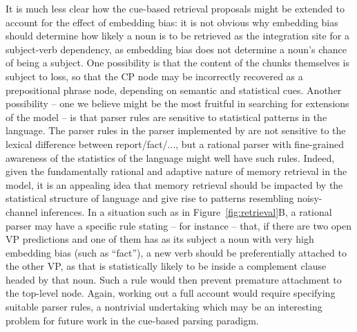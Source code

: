 It is much less clear how the cue-based retrieval proposals might be extended to account for the effect of embedding bias: it is not obvious why embedding bias should determine how likely a noun is to be retrieved as the integration site for a subject-verb dependency, as embedding bias does not determine a noun's chance of being a subject.
One possibility is that the content of the chunks themselves is subject to loss, so that the CP node may be incorrectly recovered as a prepositional phrase node, depending on semantic and statistical cues.
Another possibility -- one we believe might be the most fruitful in searching for extensions of the  \citet{lewis2005activation}  model -- is that parser rules are sensitive to statistical patterns in the language.
The parser rules in the parser implemented by \citet{lewis2005activation} are not sensitive to the lexical difference between report/fact/..., but a rational parser with fine-grained awareness of the statistics of the language might well have such rules.
Indeed, given the fundamentally rational and adaptive nature of memory retrieval in the \citet{lewis2005activation} model, it is an appealing idea that memory retrieval should be impacted by the statistical structure of language and give rise to patterns resembling noisy-channel inferences. 
In a situation such as in Figure~\ref{fig:retrieval}B, a rational parser may have a specific rule stating -- for instance -- that, if there are two open VP predictions and one of them has as its subject a noun with very high embedding bias (such as ``fact''), a new verb should be preferentially attached to the other VP, as that is statistically likely to be inside a complement clause headed by that noun.
Such a rule would then prevent premature attachment to the top-level node.
Again, working out a full account would require specifying suitable parser rules, a nontrivial undertaking which may be an interesting problem for future work in the cue-based parsing paradigm.



